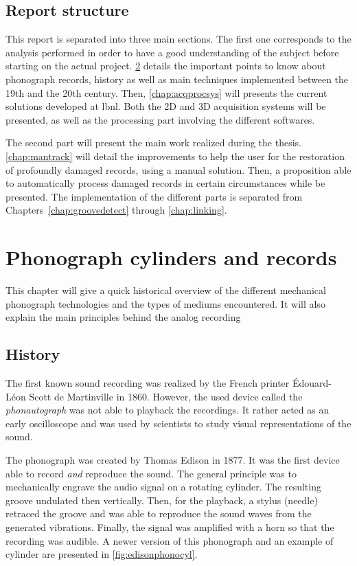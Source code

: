 \section{Report structure}

This report is separated into three main sections. The first one corresponds to the analysis performed in order to have a good understanding of the subject before starting on the actual project. \ref{chap:phonorecords} details the important points to know about phonograph records, history as well as main techniques implemented between the 19th and the 20th century. Then, \ref{chap:acqprocsys} will presents the current solutions developed at \gls{lbnl}. Both the 2D and 3D acquisition systems will be presented, as well as the processing part involving the different softwares.

The second part will present the main work realized during the thesis. \ref{chap:mantrack} will detail the improvements to help the user for the restoration of profoundly damaged records, using a manual solution. Then, a proposition able to automatically process damaged records in certain circumstances while be presented. The implementation of the different parts is separated from Chapters~\ref{chap:groovedetect} through \ref{chap:linking}.


\chapter{Phonograph cylinders and records}
\label{chap:phonorecords}

This chapter will give a quick historical overview of the different mechanical phonograph technologies and the types of mediums encountered. It will also explain the main principles behind the analog recording

\section{History}

The first known sound recording was realized by the French printer Édouard-Léon Scott de Martinville in 1860. However, the used device called the \emph{phonautograph} was not able to playback the recordings. It rather acted as an early oscilloscope and was used by scientists to study visual representations of the sound.

The phonograph was created by Thomas Edison in 1877. It was the first device able to record \emph{and} reproduce the sound. The general principle was to mechanically engrave the audio signal on a rotating cylinder. The resulting groove undulated then vertically. Then, for the playback, a stylus (needle) retraced the groove and was able to reproduce the sound waves from the generated vibrations. Finally, the signal was amplified with a horn so that the recording was audible. A newer version of this phonograph and an example of cylinder are presented in \autoref{fig:edisonphonocyl}.


